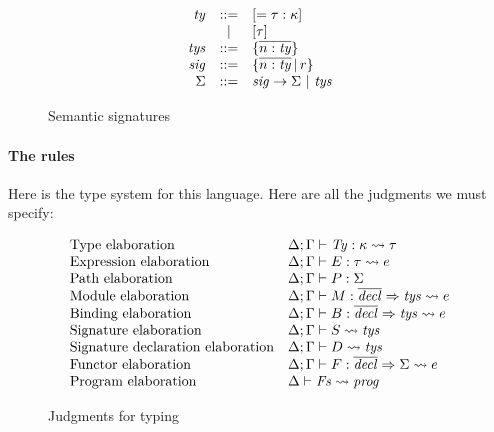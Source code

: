 \documentclass{article}
\begin{document}
\begin{figure}[H]
\[
\begin{array}{rcl}
\mathit{ty} &::=& [ = \tau : \kappa ] \\
       & | & [ \tau ] \\
\mathit{tys} &::=& \{ \overline{n : \mathit{ty}} \}\\
\mathit{sig} &::=& \{ \overline{n : \mathit{ty}} \,|\, r \}\\
\Sigma &::=& \mathit{sig} \rightarrow \Sigma ~|~ \mathit{tys} \\
\end{array}
\]
\caption{Semantic signatures}
\end{figure}

\paragraph{The rules}

Here is the type system for this language.  Here are all the judgments
we must specify:

\begin{figure}[H]
\[
\begin{array}{ll}
\mbox{Type elaboration} &\Delta; \Gamma \vdash \mathit{Ty} : \kappa \leadsto \tau \\
\mbox{Expression elaboration} &\Delta; \Gamma \vdash E : \tau \leadsto{} e \\
\mbox{Path elaboration} & \Delta; \Gamma \vdash P : \Sigma \\
\mbox{Module elaboration} & \Delta; \Gamma \vdash M : \overline{\mathit{decl}} \Rightarrow \mathit{tys} \leadsto{} e \\
\mbox{Binding elaboration} & \Delta; \Gamma \vdash B : \overline{\mathit{decl}} \Rightarrow \mathit{tys} \leadsto{} e \\
\mbox{Signature elaboration} & \Delta; \Gamma \vdash S \leadsto \mathit{tys} \\
\mbox{Signature declaration elaboration} & \Delta; \Gamma \vdash D \leadsto \mathit{tys} \\
\mbox{Functor elaboration} & \Delta; \Gamma \vdash F : \overline{\mathit{decl}} \Rightarrow \Sigma \leadsto{} e \\
\mbox{Program elaboration} & \Delta \vdash \mathit{Fs} \leadsto{} \mathit{prog} \\
\end{array}
\]
\caption{Judgments for typing}
\end{figure}
\end{document}

